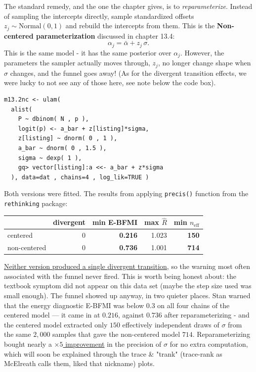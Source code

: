 \documentclass[11pt,a4paper]{article}
\begin{document}
The standard remedy, and the one the chapter gives, is to \emph{reparameterize}.
Instead of sampling the intercepts directly, sample standardized offsets
$z_j \sim \text{Normal}(0,1)$ and rebuild the intercepts from them. This is the \textbf{Non-centered parameterization} discussed in chapter 13.4:
\[
  \alpha_j = \bar\alpha + z_j\,\sigma .
\]
This is the same model - it has the same posterior over $\alpha_j$. However, the
parameters the sampler actually moves through, $z_j$, no longer change shape
when $\sigma$ changes, and the funnel goes away! (As for the divergent
transition effects, we were lucky to not see any of those here, see note below the code box).

\begin{lstlisting}
m13.2nc <- ulam(
  alist(
    P ~ dbinom( N , p ),
    logit(p) <- a_bar + z[listing]*sigma,
    z[listing] ~ dnorm( 0 , 1 ),
    a_bar ~ dnorm( 0 , 1.5 ),
    sigma ~ dexp( 1 ),
    gq> vector[listing]:a <<- a_bar + z*sigma
  ), data=dat , chains=4 , log_lik=TRUE )
\end{lstlisting}

Both versions were fitted. The results from applying \texttt{precis()} function from the \texttt{rethinking} package:

\begin{center}
\begin{tabular}{lrrrr}
\toprule
 & divergent & min E-BFMI & max $\hat{R}$ & min $n_{\text{eff}}$ \\
\midrule
centered      & 0 & \textbf{0.216} & 1.023 & \textbf{150} \\
non-centered  & 0 & \textbf{0.736} & 1.001 & \textbf{714} \\
\bottomrule
\end{tabular}
\end{center}

\underline{Neither version produced a single divergent transition}, so the warning most
often associated with the funnel never fired. This is worth being honest about:
the textbook symptom did not appear on this data set (maybe the step size used was small enough). The funnel showed up
anyway, in two quieter places. Stan warned that the energy diagnostic E-BFMI
was below $0.3$ on all four chains of the centered model --- it came in at
$0.216$, against $0.736$ after reparameterizing - and the centered model
extracted only $150$ effectively independent draws of $\sigma$ from the same
$2{,}000$ samples that gave the non-centered model $714$. Reparameterizing
bought nearly a \underline{$\times 5$ improvement} in the precision of $\sigma$ for no extra
computation, which will soon be explained through the trace \& "trank" (trace-rank as McElreath calls them, liked that nickname) plots.
\end{document}
